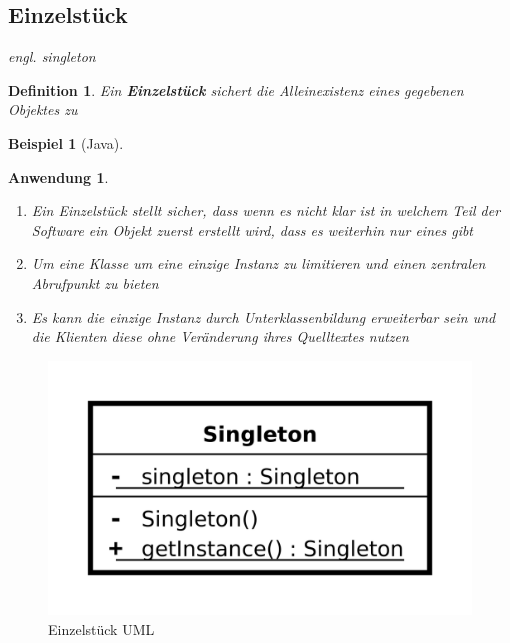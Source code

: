 \documentclass[a4paper]{article}
\theoremstyle{break}
\newtheorem{defi}{Definition}[section]
\newtheorem{ex}{Beispiel}[section]
\newtheorem{why}{Anwendung}[section]
\begin{document}
\subsection{Einzelstück}
\textit{engl. singleton}
\begin{defi}
	Ein \textbf{Einzelstück} sichert die Alleinexistenz eines gegebenen Objektes zu
\end{defi}
\begin{ex}[Java]
		
\end{ex}
\begin{why}
	\begin{enumerate}
		\item Ein Einzelstück stellt sicher, dass wenn es nicht klar ist in welchem Teil der Software ein Objekt zuerst erstellt wird, dass es weiterhin nur eines gibt
		\item Um eine Klasse um eine einzige Instanz zu limitieren und einen zentralen Abrufpunkt zu bieten
		\item Es kann die einzige Instanz durch Unterklassenbildung
		erweiterbar sein und die Klienten diese ohne Veränderung
		ihres Quelltextes nutzen
	\end{enumerate}
\end{why}
\begin{figure}[H]
	\centering
	\includegraphics[width=\textwidth]{../diagrams/uml/SingletonPattern.png}
	\caption{Einzelstück UML}
\end{figure}
\end{document}
